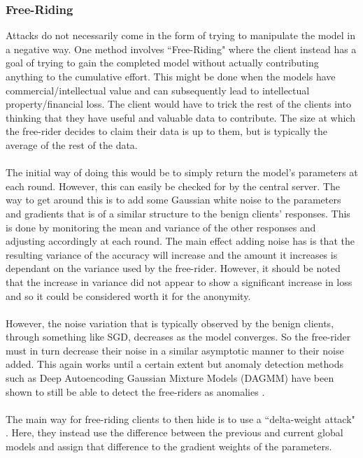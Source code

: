 \subsubsection{Free-Riding}
Attacks do not necessarily come in the form of trying to manipulate the model in a negative way. 
One method involves ``Free-Riding" \cite{free_riding} where the client instead has a goal of trying to gain the completed model without actually contributing anything to the cumulative effort. 
This might be done when the models have commercial/intellectual value and can subsequently lead to intellectual property/financial loss. 
The client would have to trick the rest of the clients into thinking that they have useful and valuable data to contribute.
The size at which the free-rider decides to claim their data is up to them, but is typically the average of the rest of the data.
\\ \\
The initial way of doing this would be to simply return the model's parameters at each round. 
However, this can easily be checked for by the central server.
The way to get around this is to add some Gaussian white noise to the parameters and gradients that is of a similar structure to the benign clients' responses.
This is done by monitoring the mean and variance of the other responses and adjusting accordingly at each round.
The main effect adding noise has is that the resulting variance of the accuracy will increase and the amount it increases is dependant on the variance used by the free-rider.
However, it should be noted that the increase in variance did not appear to show a significant increase in loss and so it could be considered worth it for the anonymity.
\\ \\
However, the noise variation that is typically observed by the benign clients, through something like SGD, decreases as the model converges.
So the free-rider must in turn decrease their noise in a similar asymptotic manner to their noise added.
This again works until a certain extent but anomaly detection methods such as Deep Autoencoding Gaussian Mixture Models (DAGMM) \cite{dagmm} have been shown to still be able to detect the free-riders as anomalies \cite{freerider_defence}.
\\ \\
The main way for free-riding clients to then hide is to use a ``delta-weight attack" \cite{freerider_defence}.
Here, they instead use the difference between the previous and current global models and assign that difference to the gradient weights of the parameters.
